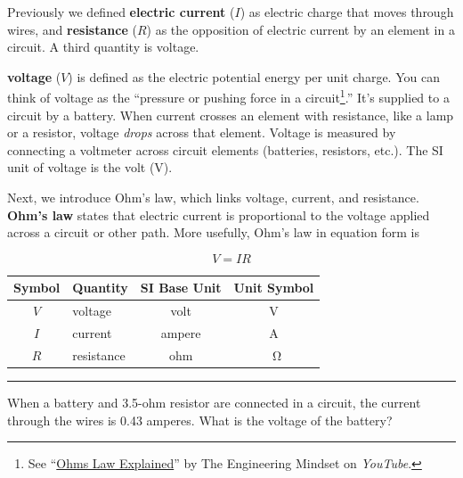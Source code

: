 \documentclass[dvipsnames]{article}
\begin{document}
Previously we defined \textbf{electric current} ($I$) as electric charge that moves through wires, and \textbf{resistance} ($R$) as the opposition of electric current by an element in a circuit. A third quantity is voltage.

\vspace{1em}

\textbf{voltage} ($V$) is defined as the electric potential energy per unit charge. You can think of voltage as the ``pressure or pushing force in a circuit\footnote{See ``\href{https://youtu.be/HsLLq6Rm5tU?t=291}{Ohms Law Explained}'' by The Engineering Mindset on \textit{YouTube}.}.'' It's supplied to a circuit by a battery. When current crosses an element with resistance, like a lamp or a resistor, voltage \textit{drops} across that element. Voltage is measured by connecting a voltmeter across circuit elements (batteries, resistors, etc.). The SI unit of voltage is the volt (V). 

\vspace{1em}

Next, we introduce Ohm's law, which links voltage, current, and resistance. \textbf{Ohm's law} states that electric current is proportional to the voltage applied across a circuit or other path. More usefully, Ohm's law in equation form is

\begin{equation} \label{cS0E6k}
    V = IR
\end{equation}

\begin{center}
    \begin{tabular}{cl|cc}
    \hline
    \textbf{Symbol} & \textbf{Quantity} & \textbf{SI Base Unit} & \textbf{Unit Symbol}  \\
    \hline\hline
    \rule{0pt}{2.5ex}
        $V$ & voltage & volt & V\\
        $I$ & current & ampere & A\\
        $R$ & resistance & ohm & \qty{}{\ohm}\\
    \hline
    \end{tabular}
\end{center}

\hrule

\begin{example}
    When a battery and 3.5-ohm resistor are connected in a circuit, the current through the wires is 0.43 amperes. What is the voltage of the battery?
\end{example}
\end{document}
